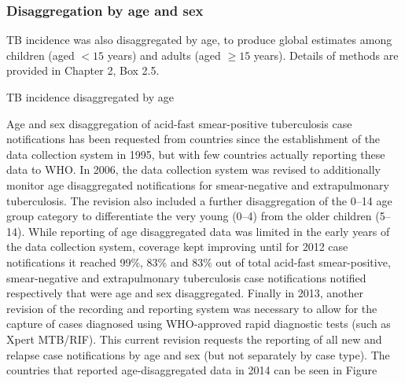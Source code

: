 \subsubsection{Disaggregation by age and sex}

TB incidence was also disaggregated by age, to produce global estimates among children (aged $< 15$ years) and adults (aged $\geq 15$ years). Details of methods are provided in Chapter 2, Box 2.5.  

TB incidence disaggregated by age 

Age and sex disaggregation of acid-fast smear-positive tuberculosis case notifications has been requested from countries since the establishment of the data collection system in 1995, but with few countries actually reporting these data to WHO. In 2006, the data collection system was revised to additionally monitor age disaggregated notifications for smear-negative and extrapulmonary tuberculosis. The revision also included a further disaggregation of the 0–14 age group category to differentiate the very young (0–4) from the older children (5–14). While reporting of age disaggregated data was limited in the early years of the data collection system, coverage kept improving until for 2012 case notifications it reached 99\%, 83\% and 83\% out of total acid-fast smear-positive, smear-negative and extrapulmonary tuberculosis case notifications notified respectively that were age and sex disaggregated. Finally in 2013, another revision of the recording and reporting system was necessary to allow for the capture of cases diagnosed using WHO-approved rapid diagnostic tests (such as Xpert MTB/RIF). This current revision requests the reporting of all new and relapse case notifications by age and sex (but not separately by case type). The countries that reported age-disaggregated data in 2014 can be seen in Figure 


